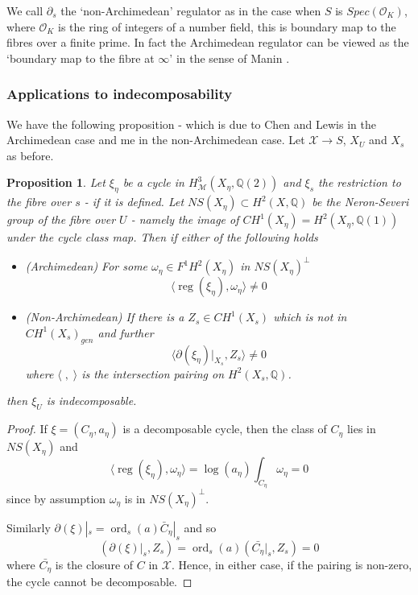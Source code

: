 \documentclass[11pt,a4paper]{article}
\newtheorem{prop}[defn]{Proposition}
\newcommand {\XX}{{\mathcal X}}
\newcommand {\Q}{{\mathds Q}}
\newcommand {\OO}{{\mathcal O}}
\newcommand {\M}{{\mathcal M}}
\def\ord{\operatorname{ord}}
\def\reg{\operatorname{reg}}
\begin{document}
We call $\partial_s$ the `non-Archimedean' regulator as in the case when $S$ is $Spec(\OO_K)$, where $\OO_K$ is the ring of integers of a number field, this is boundary map to the fibres over a finite prime. In fact the Archimedean regulator can be viewed as the `boundary map to the fibre at $\infty$' in the sense of Manin \cite{mani}. 


\subsubsection{Applications to indecomposability}

We have the following proposition - which is due to Chen and Lewis \cite{chle} in the Archimedean case and me \cite{sree2014} in the non-Archimedean case. Let $\XX \rightarrow S$, $X_{U}$ and $X_s$ as before.  

\begin{prop} Let $\xi_{\eta}$ be a cycle in $H^3_{\M}(X_{\eta},\Q(2))$ and $\xi_s$ the restriction to the fibre over $s$ - if it is defined. Let $NS(X_{\eta}) \subset H^2(X,\Q)$ be the Neron-Severi group of the fibre over $U$ - namely the image of  $CH^1(X_{\eta})=H^2(X_{\eta},\Q(1))$ under the cycle class map. Then if either of the following holds 
\begin{itemize} 
	
	\item (Archimedean) For some  $\omega_{\eta} \in F^1H^2(X_{\eta})$ in $NS(X_{\eta})^{\perp}$ 
%
$$\langle\reg(\xi_{\eta}),\omega_{\eta}\rangle \neq 0$$
%



\item (Non-Archimedean) If there is a $Z_s \in CH^1(X_s)$ which is not in $CH^1(X_s)_{gen}$ and further 
%
$$\langle \partial (\xi_{\eta})|_{X_s},Z_s \rangle \neq 0$$
%
where $\langle \;,\;\rangle$ is the intersection pairing on $H^2(X_s,\Q)$.
\end{itemize}

then $\xi_U$ is indecomposable. 
\label{indecomposiblecriterion}
\end{prop}

\begin{proof}If $\xi=(C_{\eta},a_{\eta})$ is a decomposable cycle, then the class of $C_{\eta}$ lies in $NS(X_{\eta})$ and 
%
$$\langle \reg(\xi_{\eta}),\omega_{\eta}\rangle = \log(a_{\eta}) \int_{C_{\eta}} \omega_{\eta} =0$$
%
since by assumption $\omega_{\eta}$ is in $NS(X_{\eta})^{\perp}$.

Similarly $\partial(\xi)|_s=\ord_s(a) \bar{C}_{\eta} |_s$ and so 
%
$$(\partial(\xi)|_s,Z_s)=\ord_s(a) (\bar{C_{\eta}}|_s,Z_s)=0$$
%
where $\bar{C_{\eta}}$ is the closure of $C$ in $\XX$. Hence, in either case, if the pairing is non-zero, the cycle cannot be decomposable. 

\end{proof}
\end{document}
